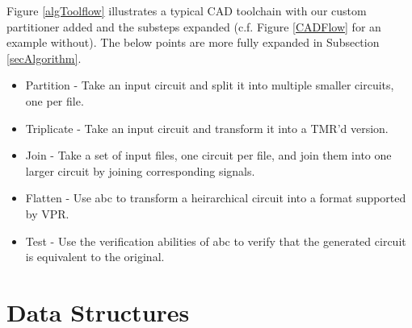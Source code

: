 \documentclass[12pt,final,oneside]{dwThesis} %
\begin{document}
   Figure \ref{algToolflow} illustrates a typical \ac{CAD} toolchain with our custom partitioner added and the substeps expanded (c.f. Figure \ref{CADFlow} for an example without). The below points are more fully expanded in Subsection \ref{secAlgorithm}.
   \begin{itemize}
      \item Partition - Take an input circuit and split it into multiple smaller circuits, one per file.
      \item Triplicate - Take an input circuit and transform it into a TMR'd version.
      \item Join - Take a set of input files, one circuit per file, and join them into one larger circuit by joining corresponding signals.
      \item Flatten - Use abc to transform a heirarchical circuit into a format supported by VPR.
      \item Test - Use the verification abilities of abc to verify that the generated circuit is equivalent to the original.
   \end{itemize}

   \section{Data Structures}\label{secDatastructures}
\end{document}
